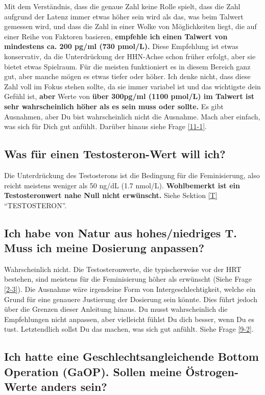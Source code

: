 \documentclass{article}
\begin{document}
{Mit dem Verständnis, dass die genaue Zahl keine Rolle spielt, dass die Zahl aufgrund der Latenz immer etwas höher sein wird als das, was beim Talwert gemessen wird, und dass die Zahl in einer Wolke von Möglichkeiten liegt, die auf einer Reihe von Faktoren basieren, \textbf{empfehle ich einen Talwert von mindestens ca. 200 pg/ml (730 pmol/L).} Diese Empfehlung ist etwas konservativ, da die Unterdrückung der HHN-Achse schon früher erfolgt, aber sie bietet etwas Spielraum. Für die meisten funktioniert es in diesem Bereich ganz gut, aber manche mögen es etwas tiefer oder höher. Ich denke nicht, dass diese Zahl voll im Fokus stehen sollte, da sie immer variabel ist und das wichtigste dein Gefühl ist, \textbf{aber} Werte von \textbf{über 300pg/ml (1100 pmol/L) im Talwert ist sehr wahrscheinlich höher als es sein muss oder sollte.} Es gibt Ausnahmen, aber Du bist wahrscheinlich nicht die Ausnahme. Mach aber einfach, was sich für Dich gut anfühlt. Darüber hinaus siehe Frage \ref{11-1}.

\subsection{Was für einen Testosteron-Wert will ich?}

Die Unterdrückung des Testosterons ist die Bedingung für die Feminisierung, also reicht meistens weniger als 50 ng/dL (1.7 nmol/L). \textbf{Wohlbemerkt ist ein Testosteronwert nahe Null nicht erwünscht.} Siehe Sektion \ref{T} “TESTOSTERON”.

\subsection{Ich habe von Natur aus hohes/niedriges T. Muss ich meine Dosierung anpassen?}

Wahrscheinlich nicht. Die Testosteronwerte, die typischerweise vor der HRT bestehen, sind meistens für die Feminisierung höher als erwünscht (Siehe Frage \ref{2-3}). Die Ausnahme wäre irgendeine Form von  Intergeschlechtigkeit, welche ein Grund für eine genauere Justierung der Dosierung sein könnte. Dies führt jedoch über die Grenzen dieser Anleitung hinaus. Du musst wahrscheinlich die Empfehlungen nicht anpassen, aber vielleicht fühlst Du dich besser, wenn Du es tust. Letztendlich sollst Du das machen, was sich gut anfühlt. Siehe Frage \ref{9-2}.

\subsection{Ich hatte eine Geschlechtsangleichende Bottom Operation (GaOP). Sollen meine Östrogen-Werte anders sein?}

}
\end{document}
